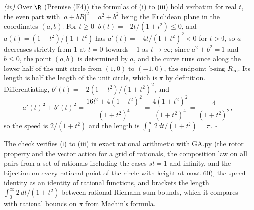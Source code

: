 \emph{(iv)} Over $\R$ (Premise (F4)) the formulas of (i) to (iii) hold verbatim for real $t$, the even part with $|a + bB|^{2} = a^{2} + b^{2}$ being the Euclidean plane in the coordinates $(a, b)$. For $t \ge 0$, $b(t) = -2t/(1 + t^{2}) \le 0$, and $a(t) = (1 - t^{2})/(1 + t^{2})$ has $a'(t) = -4t/(1 + t^{2})^{2} < 0$ for $t > 0$, so $a$ decreases strictly from $1$ at $t = 0$ towards $-1$ as $t \to \infty$; since $a^{2} + b^{2} = 1$ and $b \le 0$, the point $(a, b)$ is determined by $a$, and the curve runs once along the lower half of the unit circle from $(1, 0)$ to $(-1, 0)$, the endpoint being $R_{\infty}$. Its length is half the length of the unit circle, which is $\pi$ by definition. Differentiating, $b'(t) = -2(1 - t^{2})/(1 + t^{2})^{2}$, and
\[
a'(t)^{2} + b'(t)^{2} = \frac{16t^{2} + 4(1 - t^{2})^{2}}{(1 + t^{2})^{4}} = \frac{4(1 + t^{2})^{2}}{(1 + t^{2})^{4}} = \frac{4}{(1 + t^{2})^{2}},
\]
so the speed is $2/(1 + t^{2})$ and the length is $\int_{0}^{\infty} 2\,dt/(1 + t^{2}) = \pi$. $\square$

The check verifies (i) to (iii) in exact rational arithmetic with GA.py (the rotor property and the vector action for a grid of rationals, the composition law on all pairs from a set of rationals including the cases $st = 1$ and infinity, and the bijection on every rational point of the circle with height at most $60$), the speed identity as an identity of rational functions, and brackets the length $\int_{0}^{\infty} 2\,dt/(1 + t^{2})$ between rational Riemann-sum bounds, which it compares with rational bounds on $\pi$ from Machin's formula.
